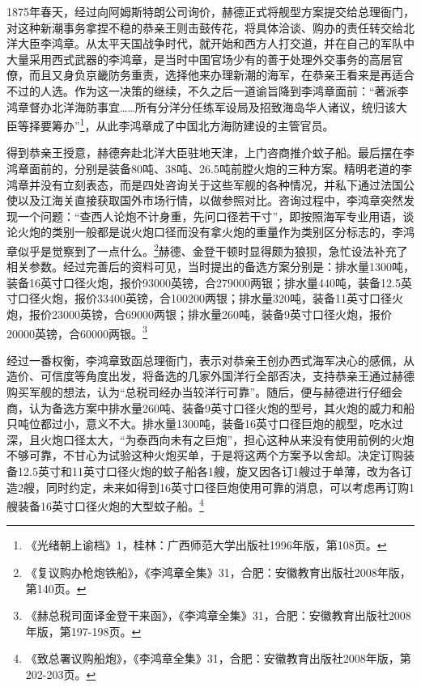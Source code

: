 \documentclass[12pt,UTF8]{ctexbook}
\begin{document}
1875年春天，经过向阿姆斯特朗公司询价，赫德正式将舰型方案提交给总理衙门，对这种新潮事务拿捏不稳的恭亲王则击鼓传花，将具体洽谈、购办的责任转交给北洋大臣李鸿章。从太平天国战争时代，就开始和西方人打交道，并在自己的军队中大量采用西式武器的李鸿章，是当时中国官场少有的善于处理外交事务的高层官僚，而且又身负京畿防务重责，选择他来办理新潮的海军，在恭亲王看来是再适合不过的人选。作为这一决策的继续，不久之后一道谕旨降到李鸿章面前：“著派李鸿章督办北洋海防事宜……所有分洋分任练军设局及招致海岛华人诸议，统归该大臣等择要筹办”\footnote{《光绪朝上谕档》1，桂林：广西师范大学出版社1996年版，第108页。}，从此李鸿章成了中国北方海防建设的主管官员。

得到恭亲王授意，赫德奔赴北洋大臣驻地天津，上门咨商推介蚊子船。最后摆在李鸿章面前的，分别是装备80吨、38吨、26.5吨前膛火炮的三种方案。精明老道的李鸿章并没有立刻表态，而是四处咨询关于这些军舰的各种情况，并私下通过法国公使以及江海关直接获取国外市场行情，以做参照对比。咨询过程中，李鸿章突然发现一个问题：“查西人论炮不计身重，先问口径若干寸”，即按照海军专业用语，谈论火炮的类别一般都是说火炮口径而没有拿火炮的重量作为类别区分标志的，李鸿章似乎是觉察到了一点什么。\footnote{《复议购办枪炮铁船》，《李鸿章全集》31，合肥：安徽教育出版社2008年版，第140页。}赫德、金登干顿时显得颇为狼狈，急忙设法补充了相关参数。经过完善后的资料可见，当时提出的备选方案分别是：排水量1300吨，装备16英寸口径火炮，报价93000英镑，合279000两银；排水量440吨，装备12.5英寸口径火炮，报价33400英镑，合100200两银；排水量320吨，装备11英寸口径火炮，报价23000英镑，合69000两银；排水量260吨，装备9英寸口径火炮，报价20000英镑，合60000两银。\footnote{《赫总税司面译金登干来函》，《李鸿章全集》31，合肥：安徽教育出版社2008年版，第197-198页。}

经过一番权衡，李鸿章致函总理衙门，表示对恭亲王创办西式海军决心的感佩，从造价、可信度等角度出发，将备选的几家外国洋行全部否决，支持恭亲王通过赫德购买军舰的想法，认为“总税司经办当较洋行可靠”。随后，便与赫德进行仔细会商，认为备选方案中排水量260吨、装备9英寸口径火炮的型号，其火炮的威力和船只吨位都过小，意义不大。排水量1300吨，装备16英寸口径巨炮的舰型，吃水过深，且火炮口径太大，“为泰西向未有之巨炮”，担心这种从来没有使用前例的火炮不够可靠，不甘心为试验这种火炮买单，于是将这两个方案予以舍却。决定订购装备12.5英寸和11英寸口径火炮的蚊子船各1艘，旋又因各订1艘过于单薄，改为各订造2艘，同时约定，未来如得到16英寸口径巨炮使用可靠的消息，可以考虑再订购1艘装备16英寸口径火炮的大型蚊子船。\footnote{《致总署议购船炮》，《李鸿章全集》31，合肥：安徽教育出版社2008年版，第202-203页。}
\end{document}
